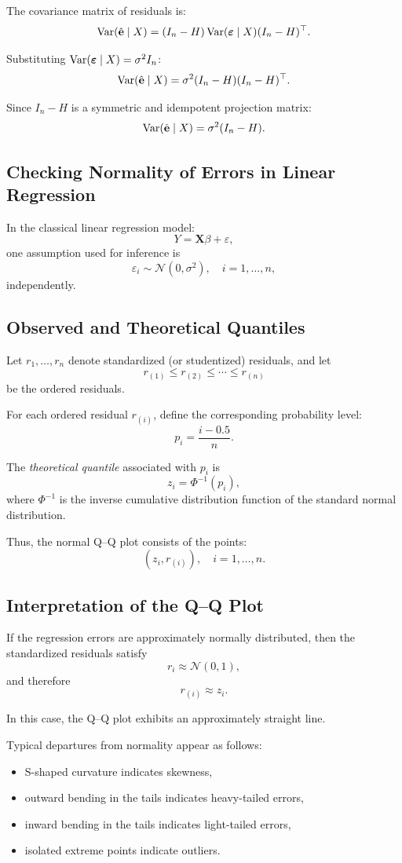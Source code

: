 The covariance matrix of residuals is:
\[
\operatorname{Var}(\hat{\mathbf{e}} \mid X)
= (I_n - H)\operatorname{Var}(\boldsymbol{\varepsilon} \mid X)(I_n - H)^\top.
\]

Substituting $\operatorname{Var}(\boldsymbol{\varepsilon} \mid X)=\sigma^2 I_n$:
\[
\operatorname{Var}(\hat{\mathbf{e}} \mid X)
= \sigma^2 (I_n - H)(I_n - H)^\top.
\]

Since $I_n - H$ is a symmetric and idempotent projection matrix:
\[
\operatorname{Var}(\hat{\mathbf{e}} \mid X)
= \sigma^2 (I_n - H).
\]

\subsection{Checking Normality of Errors in Linear Regression}

In the classical linear regression model:
\[
Y = \mathbf{X}\beta + \varepsilon,
\]
one assumption used for inference is
\[
\varepsilon_i \sim \mathcal{N}(0,\sigma^2), \quad i = 1,\dots,n,
\]
independently.

\subsection{Observed and Theoretical Quantiles}

Let $r_1,\dots,r_n$ denote standardized (or studentized) residuals, and let
\[
r_{(1)} \le r_{(2)} \le \cdots \le r_{(n)}
\]
be the ordered residuals.

For each ordered residual $r_{(i)}$, define the corresponding probability level:
\[
p_i = \frac{i - 0.5}{n}.
\]

The \emph{theoretical quantile} associated with $p_i$ is
\[
z_i = \Phi^{-1}(p_i),
\]
where $\Phi^{-1}$ is the inverse cumulative distribution function of the standard normal distribution.

Thus, the normal Q--Q plot consists of the points:
\[
(z_i, r_{(i)}), \quad i = 1,\dots,n.
\]

\subsection{Interpretation of the Q--Q Plot}

If the regression errors are approximately normally distributed, then the standardized residuals satisfy
\[
r_i \approx \mathcal{N}(0,1),
\]
and therefore
\[
r_{(i)} \approx z_i.
\]

In this case, the Q--Q plot exhibits an approximately straight line.

Typical departures from normality appear as follows:
\begin{itemize}
  \item S-shaped curvature indicates skewness,
  \item outward bending in the tails indicates heavy-tailed errors,
  \item inward bending in the tails indicates light-tailed errors,
  \item isolated extreme points indicate outliers.
\end{itemize}

